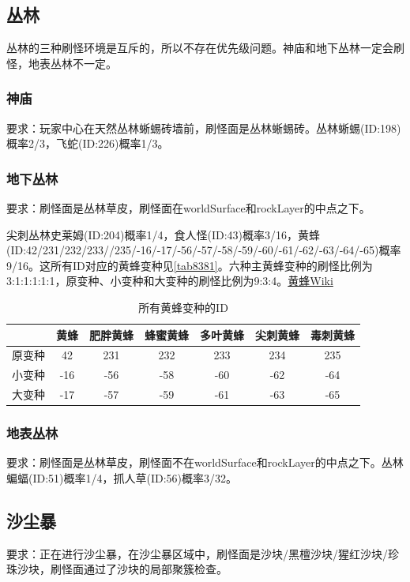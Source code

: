 \subsection{丛林}
丛林的三种刷怪环境是互斥的，所以不存在优先级问题。神庙和地下丛林一定会刷怪，地表丛林不一定。

\subsubsection{神庙}
要求：玩家中心在天然丛林蜥蜴砖墙前，刷怪面是丛林蜥蜴砖。丛林蜥蜴(ID:198)概率2/3，飞蛇(ID:226)概率1/3。

\subsubsection{地下丛林}
要求：刷怪面是丛林草皮，刷怪面在worldSurface和rockLayer的中点之下。

尖刺丛林史莱姆(ID:204)概率1/4，食人怪(ID:43)概率3/16，黄蜂(ID:42/231/232/233//235/-16/-17/-56/-57/-58/-59/-60/-61/-62/-63/-64/-65)概率9/16。这所有ID对应的黄蜂变种见\autoref{tab8381}。六种主黄蜂变种的刷怪比例为3:1:1:1:1:1，原变种、小变种和大变种的刷怪比例为9:3:4。\href{https://terraria-zh.gamepedia.com/黄蜂}{黄蜂Wiki}

\begin{table}[!ht]
    \centering
    \begin{tabular}{c|cccccc}
         &黄蜂&肥胖黄蜂&蜂蜜黄蜂&多叶黄蜂&尖刺黄蜂&毒刺黄蜂\\\hline
         原变种&42&231&232&233&234&235\\
         小变种&-16&-56&-58&-60&-62&-64\\
         大变种&-17&-57&-59&-61&-63&-65
    \end{tabular}
    \caption{所有黄蜂变种的ID}
    \label{tab8381}
\end{table}

\subsubsection{地表丛林}
要求：刷怪面是丛林草皮，刷怪面不在worldSurface和rockLayer的中点之下。丛林蝙蝠(ID:51)概率1/4，抓人草(ID:56)概率3/32。

\subsection{沙尘暴}
要求：正在进行沙尘暴，在沙尘暴区域中，刷怪面是沙块/黑檀沙块/猩红沙块/珍珠沙块，刷怪面通过了沙块的局部聚簇检查。

